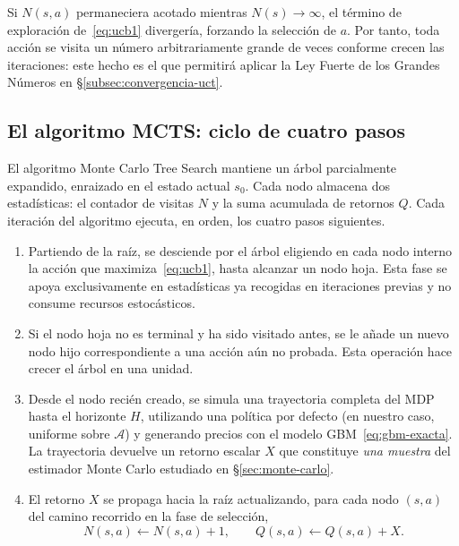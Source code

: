 \begin{observacion}
\label{obs:visitas}
Si $N(s,a)$ permaneciera acotado mientras $N(s) \to \infty$, el término de exploración de~\eqref{eq:ucb1} divergería, forzando la selección de $a$. Por tanto, toda acción se visita un número arbitrariamente grande de veces conforme crecen las iteraciones: este hecho es el que permitirá aplicar la Ley Fuerte de los Grandes Números en §\ref{subsec:convergencia-uct}.
\end{observacion}

\subsection{El algoritmo MCTS: ciclo de cuatro pasos}
\label{subsec:mcts-4pasos}

El algoritmo Monte Carlo Tree Search mantiene un árbol parcialmente expandido, enraizado en el estado actual $s_0$. Cada nodo almacena dos estadísticas: el contador de visitas $N$ y la suma acumulada de retornos $Q$. Cada iteración del algoritmo ejecuta, en orden, los cuatro pasos siguientes.

\begin{enumerate}
    \item[\textbf{\footnotesize{(1) Selección.}}] Partiendo de la raíz, se desciende por el árbol eligiendo en cada nodo interno la acción que maximiza~\eqref{eq:ucb1}, hasta alcanzar un nodo hoja. Esta fase se apoya exclusivamente en estadísticas ya recogidas en iteraciones previas y no consume recursos estocásticos.

    \item[\textbf{\footnotesize{(2) Expansión.}}] Si el nodo hoja no es terminal y ha sido visitado antes, se le añade un nuevo nodo hijo correspondiente a una acción aún no probada. Esta operación hace crecer el árbol en una unidad.

    \item[\textbf{\footnotesize{(3) Rollout.}}] Desde el nodo recién creado, se simula una trayectoria completa del MDP hasta el horizonte $H$, utilizando una política por defecto (en nuestro caso, uniforme sobre $\mathcal{A}$) y generando precios con el modelo GBM~\eqref{eq:gbm-exacta}. La trayectoria devuelve un retorno escalar $X$ que constituye \emph{una muestra} del estimador Monte Carlo estudiado en §\ref{sec:monte-carlo}.

    \item[\textbf{\footnotesize{(4) Retroprop.}}] El retorno $X$ se propaga hacia la raíz actualizando, para cada nodo $(s,a)$ del camino recorrido en la fase de selección,
    \[
        N(s,a) \leftarrow N(s,a) + 1, \qquad Q(s,a) \leftarrow Q(s,a) + X.
    \]
\end{enumerate}

